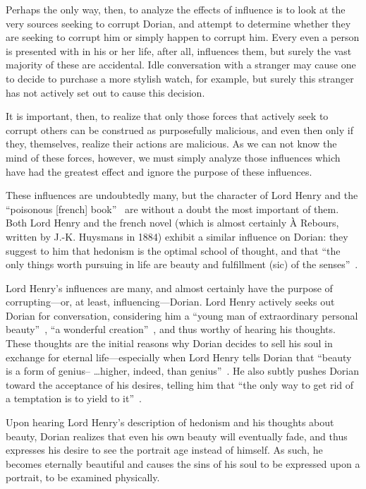 \documentclass[12pt]{article}
\begin{document}
Perhaps the only way, then, to analyze the effects of influence is to look at the very sources seeking to corrupt Dorian, and attempt to determine whether they are seeking to corrupt him or simply happen to corrupt him. Every even a person is presented with in his or her life, after all, influences them, but surely the vast majority of these are accidental. Idle conversation with a stranger may cause one to decide to purchase a more stylish watch, for example, but surely this stranger has not actively set out to cause this decision.

It is important, then, to realize that only those forces that actively seek to corrupt others can be construed as purposefully malicious, and even then only if they, themselves, realize their actions are malicious. As we can not know the mind of these forces, however, we must simply analyze those influences which have had the greatest effect and ignore the purpose of these influences.

These influences are undoubtedly many, but the character of Lord Henry and the ``poisonous [french] book''~\cite[128]{wilde} are without a doubt the most important of them. Both Lord Henry and the french novel (which is almost certainly À Rebours, written by J.-K. Huysmans in 1884) exhibit a similar influence on Dorian: they suggest to him that hedonism is the optimal school of thought, and that ``the only things worth pursuing in life are beauty and fulfillment (sic) of the senses''~\cite{wk}.

Lord Henry's influences are many, and almost certainly have the purpose of corrupting—or, at least, influencing—Dorian. Lord Henry actively seeks out Dorian for conversation, considering him a ``young man of extraordinary personal beauty''~\cite[3]{wilde}, ``a wonderful creation''~\cite[23]{wilde}, and thus worthy of hearing his thoughts. These thoughts are the initial reasons why Dorian decides to sell his soul in exchange for eternal life—especially when Lord Henry tells Dorian that ``beauty is a form of genius-- \dots higher, indeed, than genius''~\cite[24]{wilde}. He also subtly pushes Dorian toward the acceptance of his desires, telling him that ``the only way to get rid of a temptation is to yield to it''~\cite[20]{wilde}.

Upon hearing Lord Henry's description of hedonism and his thoughts about beauty, Dorian realizes that even his own beauty will eventually fade, and thus expresses his desire to see the portrait age instead of himself. As such, he becomes eternally beautiful and causes the sins of his soul to be expressed upon a portrait, to be examined physically.
\end{document}
